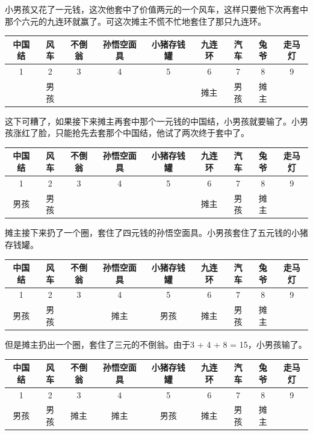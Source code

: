 \documentclass[UTF8]{article}
\begin{document}
小男孩又花了一元钱，这次他套中了价值两元的一个风车，这样只要他下次再套中那个六元的九连环就赢了。可这次摊主不慌不忙地套住了那只九连环。

\vspace{5mm}
\begin{tabular}{|c|c|c|c|c|c|c|c|c|}
\hline
中国结 & 风车 & 不倒翁 & 孙悟空面具 & 小猪存钱罐 & 九连环 & 汽车 & 兔爷 & 走马灯 \\
\hline
1 & 2 & 3 & 4 & 5 & 6 & 7 & 8 & 9 \\
\hline
  & 男孩  &   &   &   & 摊主  & 男孩 & 摊主 & \\
\hline
\end{tabular}
\vspace{5mm}

这下可糟了，如果接下来摊主再套中那个一元钱的中国结，小男孩就要输了。小男孩涨红了脸，只能抢先去套那个中国结，他试了两次终于套中了。

\vspace{5mm}
\begin{tabular}{|c|c|c|c|c|c|c|c|c|}
\hline
中国结 & 风车 & 不倒翁 & 孙悟空面具 & 小猪存钱罐 & 九连环 & 汽车 & 兔爷 & 走马灯 \\
\hline
1 & 2 & 3 & 4 & 5 & 6 & 7 & 8 & 9 \\
\hline
男孩  & 男孩  &   &   &   & 摊主  & 男孩 & 摊主 & \\
\hline
\end{tabular}
\vspace{5mm}

摊主接下来扔了一个圈，套住了四元钱的孙悟空面具。小男孩套住了五元钱的小猪存钱罐。

\vspace{5mm}
\begin{tabular}{|c|c|c|c|c|c|c|c|c|}
\hline
中国结 & 风车 & 不倒翁 & 孙悟空面具 & 小猪存钱罐 & 九连环 & 汽车 & 兔爷 & 走马灯 \\
\hline
1 & 2 & 3 & 4 & 5 & 6 & 7 & 8 & 9 \\
\hline
男孩  & 男孩  &   & 摊主  & 男孩  & 摊主  & 男孩 & 摊主 & \\
\hline
\end{tabular}
\vspace{5mm}

但是摊主扔出一个圈，套住了三元的不倒翁。由于3 + 4 + 8 = 15，小男孩输了。

\vspace{5mm}
\begin{tabular}{|c|c|c|c|c|c|c|c|c|}
\hline
中国结 & 风车 & 不倒翁 & 孙悟空面具 & 小猪存钱罐 & 九连环 & 汽车 & 兔爷 & 走马灯 \\
\hline
1 & 2 & 3 & 4 & 5 & 6 & 7 & 8 & 9 \\
\hline
男孩  & 男孩  & 摊主  & 摊主  & 男孩  & 摊主  & 男孩 & 摊主 & \\
\hline
\end{tabular}
\vspace{5mm}
\end{document}
